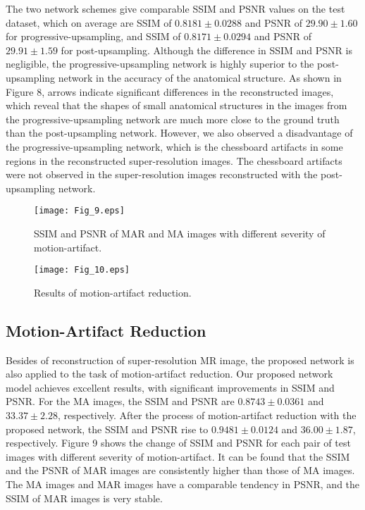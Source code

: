 \documentclass[runningheads]{llncs}
\begin{document}
The two network schemes give comparable SSIM and PSNR values on the test dataset, which on average are SSIM of $0.8181\pm0.0288$ and PSNR of $29.90\pm1.60$ for progressive-upsampling, and SSIM of $0.8171\pm0.0294$ and PSNR of $29.91\pm1.59$ for post-upsampling. Although the difference in SSIM and PSNR is negligible, the progressive-upsampling network is highly superior to the post-upsampling network in the accuracy of the anatomical structure. As shown in Figure 8, arrows indicate significant differences in the reconstructed images, which reveal that the shapes of small anatomical structures in the images from the progressive-upsampling network are much more close to the ground truth than the post-upsampling network. However, we also observed a disadvantage of the progressive-upsampling network, which is the chessboard artifacts in some regions in the reconstructed super-resolution images. The chessboard artifacts were not observed in the super-resolution images reconstructed with the post-upsampling network.

\begin{figure}
\texttt{[image: Fig\_9.eps]}
\caption{SSIM and PSNR of MAR and MA images with different severity of motion-artifact.} \label{Fig_9}
\end{figure}

\begin{figure}
\texttt{[image: Fig\_10.eps]}
\caption{Results of motion-artifact reduction.} \label{Fig_10}
\end{figure}

\subsection{Motion-Artifact Reduction}

Besides of reconstruction of super-resolution MR image, the proposed network is also applied to the task of motion-artifact reduction. Our proposed network model achieves excellent results, with significant improvements in SSIM and PSNR. For the MA images, the SSIM and PSNR are $0.8743\pm0.0361$ and $33.37\pm2.28$, respectively. After the process of motion-artifact reduction with the proposed network, the SSIM and PSNR rise to $0.9481\pm0.0124$ and $36.00\pm1.87$, respectively. Figure 9 shows the change of SSIM and PSNR for each pair of test images with different severity of motion-artifact. It can be found that the SSIM and the PSNR of MAR images are consistently higher than those of MA images. The MA images and MAR images have a comparable tendency in PSNR, and the SSIM of MAR images is very stable.
\end{document}
